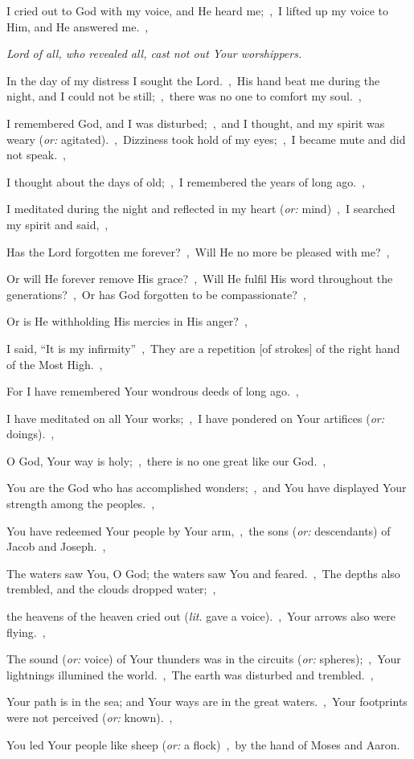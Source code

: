 \documentclass[12pt,twoside,a5paper]{article}
\newcommand{\qanona}[1]{{\liturgicalhint{Qanona.} \emph{#1}}}
\newcommand{\translationoption}[1]{\emph{or:} #1}
\newcommand{\translationliteral}[1]{\emph{lit.} #1}
\begin{document}
\begin{normalparskip}
  I cried out to God with my voice, and He heard me;~\sep\ I lifted up my voice to Him, and He answered me.~\sep

  \qanona{Lord of all, who revealed all, cast not out Your worshippers.}

  In the day of my distress I sought the Lord.~\sep\ His hand beat me during the night, and I could not be still;~\sep\ there was no one to comfort my soul.~\sep

  I remembered God, and I was disturbed;~\sep\ and I thought, and my spirit was weary (\translationoption{agitated}).~\sep\ Dizziness took hold of my eyes;~\sep\ I became mute and did not speak.~\sep

  I thought about the days of old;~\sep\ I remembered the years of long ago.~\sep

  I meditated during the night and reflected in my heart (\translationoption{mind})~\sep\ I searched my spirit and said,~\sep

  Has the Lord forgotten me forever?~\sep\ Will He no more be pleased with me?~\sep

  Or will He forever remove His grace?~\sep\ Will He fulfil His word throughout the generations?~\sep\ Or has God forgotten to be compassionate?~\sep

  Or is He withholding His mercies in His anger?~\sep

  I said, ``It is my infirmity''~\sep\ They are a repetition [of strokes] of the right hand of the Most High.~\sep

  For I have remembered Your wondrous deeds of long ago.~\sep

  I have meditated on all Your works;~\sep\ I have pondered on Your artifices (\translationoption{doings}).~\sep

  O God, Your way is holy;~\sep\ there is no one great like our God.~\sep

  You are the God who has accomplished wonders;~\sep\ and You have displayed Your strength among the peoples.~\sep

  You have redeemed Your people by Your arm,~\sep\ the sons (\translationoption{descendants}) of Jacob and Joseph.~\sep

  The waters saw You, O God; the waters saw You and feared.~\sep\ The depths also trembled, and the clouds dropped water;~\sep

  the heavens of the heaven cried out (\translationliteral{gave a voice}).~\sep\ Your arrows also were flying.~\sep

  The sound (\translationoption{voice}) of Your thunders was in the circuits (\translationoption{spheres});~\sep\ Your lightnings illumined the world.~\sep\ The earth was disturbed and trembled.~\sep

  Your path is in the sea; and Your ways are in the great waters.~\sep\ Your footprints were not perceived (\translationoption{known}).~\sep

  You led Your people like sheep (\translationoption{a flock})~\sep\ by the hand of Moses and Aaron.
\end{normalparskip}
\end{document}

